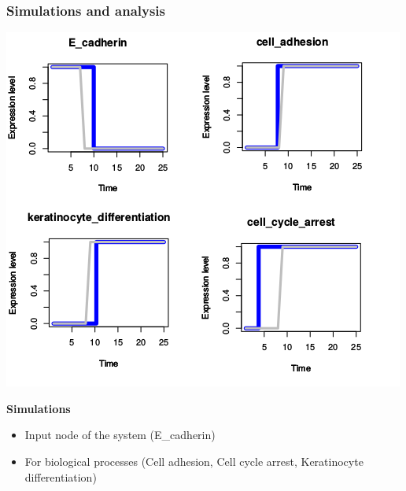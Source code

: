 \begin{frame}[c]
  \frametitle{Simulations and analysis}
  
 \begin{center}
  \includegraphics[scale=0.35]{figs/key_nodes1.png}
\end{center}

\textbf{Simulations}

\begin{itemize}
  \item Input node of the system (E\_cadherin)
 \item For biological processes (Cell adhesion, Cell cycle arrest, Keratinocyte differentiation)
  
\end{itemize}


\end{frame}
